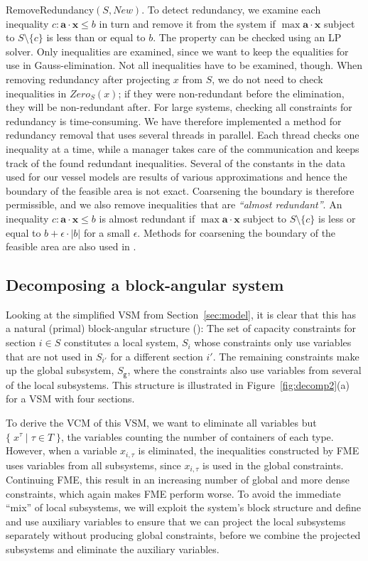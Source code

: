 \documentclass{llncs}
\newcommand{\mi}{\mathit}
\newcommand{\ve}{\mathbf}
\newcommand{\set}[2]{\{\;{#1}\;|\;{#2}\;\}}
\begin{document}
{\sc RemoveRedundancy}$(S,\mathit{New})$. To detect redundancy, we examine each inequality $c: \ve{a}\cdot \ve{x}\leq b$ in turn and remove it from the system if $\max \ve{a}\cdot \ve{x}$ subject to $S\setminus\{c\}$ is less than or equal to $b$. The property can be checked using an LP solver. Only inequalities are examined, since we want to keep the equalities for use in Gauss-elimination. Not all inequalities have to be examined, though. When removing redundancy after projecting $x$ from $S$, we do not need to check inequalities in $\mi{Zero}_S(x)$; if they were non-redundant before the elimination, they will be non-redundant after. For large systems, checking all constraints for redundancy is time-consuming. We have therefore implemented a method for redundancy removal that uses several threads in parallel. Each thread checks one inequality at a time, while a manager takes care of the communication and keeps track of the found redundant inequalities. 
Several of the constants in the data used for our vessel models are results of various approximations and hence the boundary of the feasible area is not exact. Coarsening the boundary is therefore permissible, and we also remove inequalities that are \emph{``almost redundant''}. An inequality $c: \ve{a}\cdot\ve{x}\leq b$ is almost redundant if $\max \ve{a}\cdot\ve{x}$ subject to $S\setminus\{c\}$ is less or equal to $b + \epsilon\cdot |b|$ for a small $\epsilon$. Methods for coarsening the boundary of the feasible area are also used in \cite{lukatskii08,shapot12}.

\subsection{Decomposing a block-angular system}\label{sec:decomp}
Looking at the simplified VSM from Section~\ref{sec:model}, it is clear that this has a natural (primal) block-angular structure (\cite{williams}): The set of capacity constraints for section $i\in S$ constitutes a local system, $S_i$ whose constraints only use variables that are not used in $S_{i'}$ for a different section $i'$. The remaining constraints make up the global subsystem, $S_\texttt{g}$, where the constraints also use variables from several of the local subsystems. This structure is illustrated in Figure~\ref{fig:decomp2}(a) for a VSM with four sections. 

To derive the VCM of this VSM, we want to eliminate all variables but $\set{x^\tau}{\tau\in T}$, the variables counting the number of containers of each type. However, when a variable $x_{i,\tau}$ is eliminated, the inequalities constructed by FME uses variables from all subsystems, since $x_{i,\tau}$ is used in the global constraints. Continuing FME, this result in an increasing number of global and more dense constraints, which again makes FME perform worse. 
To avoid the immediate ``mix'' of local subsystems, we will exploit the system's block structure and define and use auxiliary variables to ensure that we can project the local subsystems separately without producing global constraints, before we combine the projected subsystems and eliminate the auxiliary variables. 
\end{document}
